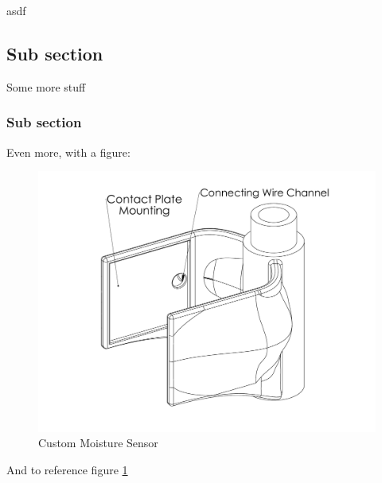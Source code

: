 asdf

\subsection{Sub section}

Some more stuff

\subsubsection{Sub section}

Even more, with a figure:

\begin{figure}[h]
    \centering
    \includegraphics[width=.5\textwidth]{images/MoistureSensor}
    \caption{Custom Moisture Sensor}
    \label{fig:moistureSensor}
\end{figure}

And to reference figure \ref{fig:moistureSensor}